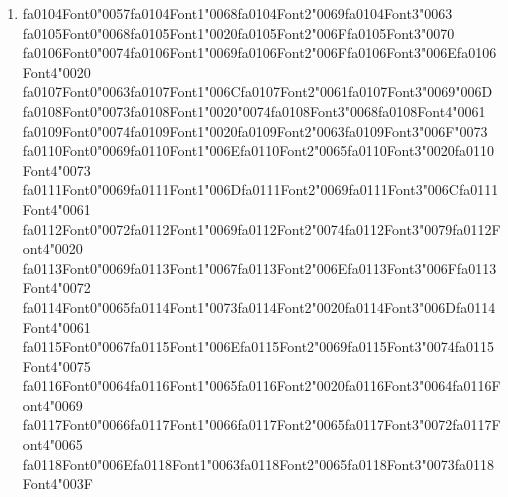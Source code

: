 \documentclass[12pt]{article}
\begin{document}
\begin{enumerate}[label=Q\arabic*.]
 \item {\csname fa0104Font0\endcsname\char"0057}{\csname fa0104Font1\endcsname\char"0068}{\csname fa0104Font2\endcsname\char"0069}{\csname fa0104Font3\endcsname\char"0063} {\csname fa0105Font0\endcsname\char"0068}{\csname fa0105Font1\endcsname\char"0020}{\csname fa0105Font2\endcsname\char"006F}{\csname fa0105Font3\endcsname\char"0070} {\csname fa0106Font0\endcsname\char"0074}{\csname fa0106Font1\endcsname\char"0069}{\csname fa0106Font2\endcsname\char"006F}{\csname fa0106Font3\endcsname\char"006E}{\csname fa0106Font4\endcsname\char"0020} {\csname fa0107Font0\endcsname\char"0063}{\csname fa0107Font1\endcsname\char"006C}{\csname fa0107Font2\endcsname\char"0061}{\csname fa0107Font3\endcsname\char"0069}{\char"006D} {\csname fa0108Font0\endcsname\char"0073}{\csname fa0108Font1\endcsname\char"0020}{\char"0074}{\csname fa0108Font3\endcsname\char"0068}{\csname fa0108Font4\endcsname\char"0061} {\csname fa0109Font0\endcsname\char"0074}{\csname fa0109Font1\endcsname\char"0020}{\csname fa0109Font2\endcsname\char"0063}{\csname fa0109Font3\endcsname\char"006F}{\char"0073} {\csname fa0110Font0\endcsname\char"0069}{\csname fa0110Font1\endcsname\char"006E}{\csname fa0110Font2\endcsname\char"0065}{\csname fa0110Font3\endcsname\char"0020}{\csname fa0110Font4\endcsname\char"0073} {\csname fa0111Font0\endcsname\char"0069}{\csname fa0111Font1\endcsname\char"006D}{\csname fa0111Font2\endcsname\char"0069}{\csname fa0111Font3\endcsname\char"006C}{\csname fa0111Font4\endcsname\char"0061} {\csname fa0112Font0\endcsname\char"0072}{\csname fa0112Font1\endcsname\char"0069}{\csname fa0112Font2\endcsname\char"0074}{\csname fa0112Font3\endcsname\char"0079}{\csname fa0112Font4\endcsname\char"0020} {\csname fa0113Font0\endcsname\char"0069}{\csname fa0113Font1\endcsname\char"0067}{\csname fa0113Font2\endcsname\char"006E}{\csname fa0113Font3\endcsname\char"006F}{\csname fa0113Font4\endcsname\char"0072} {\csname fa0114Font0\endcsname\char"0065}{\csname fa0114Font1\endcsname\char"0073}{\csname fa0114Font2\endcsname\char"0020}{\csname fa0114Font3\endcsname\char"006D}{\csname fa0114Font4\endcsname\char"0061} {\csname fa0115Font0\endcsname\char"0067}{\csname fa0115Font1\endcsname\char"006E}{\csname fa0115Font2\endcsname\char"0069}{\csname fa0115Font3\endcsname\char"0074}{\csname fa0115Font4\endcsname\char"0075} {\csname fa0116Font0\endcsname\char"0064}{\csname fa0116Font1\endcsname\char"0065}{\csname fa0116Font2\endcsname\char"0020}{\csname fa0116Font3\endcsname\char"0064}{\csname fa0116Font4\endcsname\char"0069} {\csname fa0117Font0\endcsname\char"0066}{\csname fa0117Font1\endcsname\char"0066}{\csname fa0117Font2\endcsname\char"0065}{\csname fa0117Font3\endcsname\char"0072}{\csname fa0117Font4\endcsname\char"0065} {\csname fa0118Font0\endcsname\char"006E}{\csname fa0118Font1\endcsname\char"0063}{\csname fa0118Font2\endcsname\char"0065}{\csname fa0118Font3\endcsname\char"0073}{\csname fa0118Font4\endcsname\char"003F}

\end{enumerate}
\end{document}
